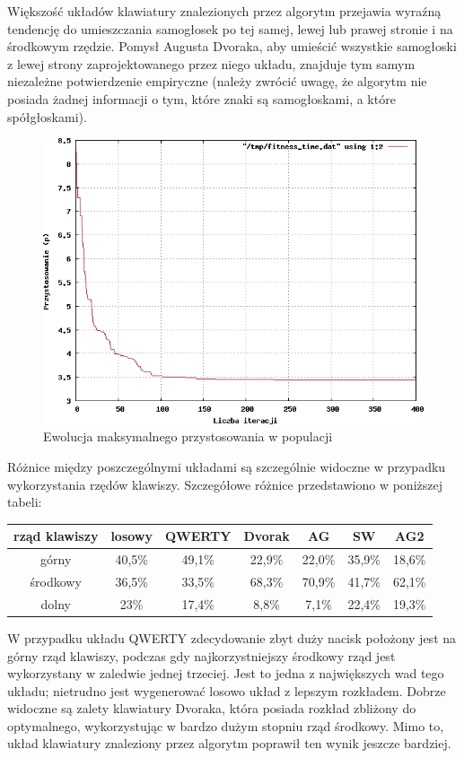\documentclass[brudnopis]{xmgr}
\begin{document}
Większość układów klawiatury znalezionych przez algorytm przejawia wyraźną tendencję do umieszczania samogłosek po tej samej, lewej lub prawej stronie i na środkowym rzędzie. Pomysł Augusta Dvoraka, aby umieścić wszystkie samogłoski z lewej strony zaprojektowanego przez niego układu, znajduje tym samym niezależne potwierdzenie empiryczne (należy zwrócić uwagę, że algorytm nie posiada żadnej informacji o tym, które znaki są samogłoskami, a które spółgłoskami).

\begin{figure}[!tbh]
\centering
\includegraphics[width=.8\hsize]{fig/fitness_time_en}
\caption{Ewolucja maksymalnego przystosowania w populacji}
\end{figure}

Różnice między poszczególnymi układami są szczególnie widoczne w przypadku wykorzystania rzędów klawiszy. Szczegółowe różnice przedstawiono w poniższej tabeli:\newline\newline
\begin{tabular}{ c | c | c | c | c | c | c }
  rząd klawiszy   & losowy & QWERTY & Dvorak & AG &     SW   & AG2 \\
  \hline
  górny           & 40,5\% & 49,1\% & 22,9\% & 22,0\% & 35,9\% & 18,6\% \\
  środkowy        & 36,5\% & 33,5\% & 68,3\% & 70,9\% & 41,7\% & 62,1\% \\
  dolny           &   23\% & 17,4\% &  8,8\% &  7,1\% & 22,4\% & 19,3\% \\
\end{tabular}\newline

W przypadku układu QWERTY zdecydowanie zbyt duży nacisk położony jest na górny rząd klawiszy, podczas gdy najkorzystniejszy środkowy rząd jest wykorzystany w zaledwie jednej trzeciej. Jest to jedna z największych wad tego układu; nietrudno jest wygenerować losowo układ z lepszym rozkładem. Dobrze widoczne są zalety klawiatury Dvoraka, która posiada rozkład zbliżony do optymalnego, wykorzystując w bardzo dużym stopniu rząd środkowy. Mimo to, układ klawiatury znaleziony przez algorytm poprawił ten wynik jeszcze bardziej.
\end{document}
